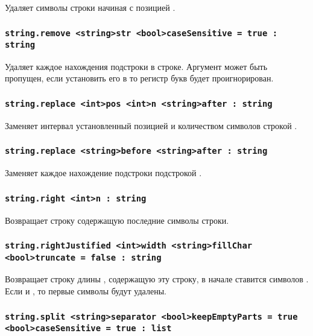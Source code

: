 \documentclass[a4paper, 14pt]{extarticle}
\begin{document}
Удаляет  символы строки начиная с позицией .

\subsubsection{\lstinline|string.remove <string>str <bool>caseSensitive = true : string|}

Удаляет каждое нахождения подстроки  в строке. Аргумент  может быть пропущен, если установить его в \false{} то регистр букв будет проигнорирован.

\subsubsection{\lstinline|string.replace <int>pos <int>n <string>after : string|}

Заменяет интервал установленный позицией  и количеством символов  строкой .

\subsubsection{\lstinline|string.replace <string>before <string>after : string|}

Заменяет каждое нахождение подстроки  подстрокой .

\subsubsection{\lstinline|string.right <int>n : string|}

Возвращает строку содержащую последние  символы строки.

\subsubsection{\lstinline|string.rightJustified <int>width <string>fillChar <bool>truncate = false : string|}

Возвращает строку длины , содержащую эту строку, в начале ставится  символов . Если  и , то первые  символы будут удалены.

\subsubsection{\lstinline|string.split <string>separator <bool>keepEmptyParts = true <bool>caseSensitive = true : list|}
\end{document}
